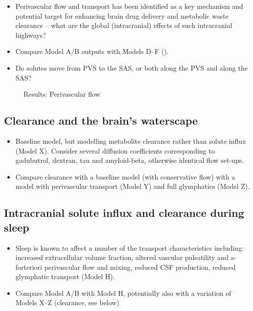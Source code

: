 \documentclass[fleqn,10pt]{wlscirep}
\newcommand{\draft}[1]{\textcolor{gray}{#1}}
\begin{document}
\begin{itemize}
\item
  Perivascular flow and transport has been identified as a key
  mechanism and potential target for enhancing brain drug delivery and
  metabolic waste clearance -- what are the global (intracranial)
  effects of such intracranial highways? 
\item
  Compare Model A/B outputs with Models D--F ().
\item
  Do solutes move from PVS to the SAS, or both along the PVS and along the SAS?
\end{itemize}

\draft{\lipsum[1]}

\begin{figure}
  \vspace{10em}
  \caption{Results: Perivascular flow}
  \label{fig:pvs}
\end{figure}

\subsection*{Clearance and the brain's waterscape}

\draft{\lipsum[1]}

\begin{itemize}
\item 
  Baseline model, but modelling metabolite clearance rather than solute
  influx (Model X). Consider several diffusion coefficients corresponding to
  gadubutrol, dextran, tau and amyloid-beta, otherwise identical flow
  set-ups. 
\item
  Compare clearance with a baseline model (with conservative flow)
  with a model with perivascular transport (Model Y) and full
  glymphatics (Model Z).
\end{itemize}

\subsection*{Intracranial solute influx and clearance during sleep}

\begin{itemize}
\item
  Sleep is known to affect a number of the transport characteristics including: increased extracellular volume fraction, altered vascular pulsatility and a-forteriori perivascular flow and mixing, reduced CSF production, reduced glymphatic transport (Model H).
\item
  Compare Model A/B with Model H, potentially also with a variation of Models X--Z (clearance, see below)
\end{itemize}
\end{document}
